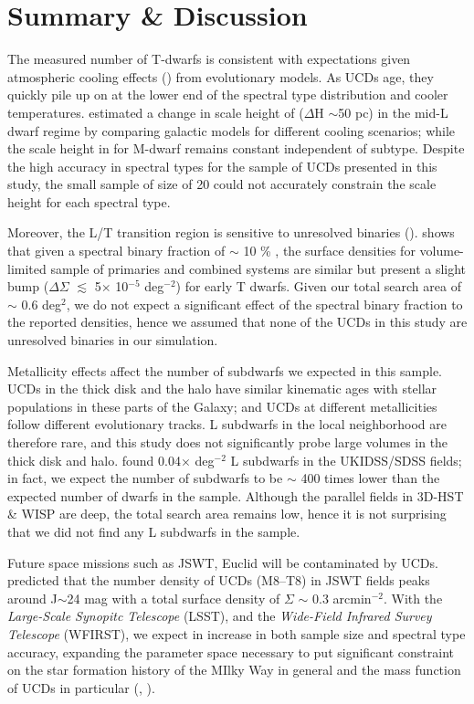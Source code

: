 \documentclass[manuscript]{aastex}
\begin{document}
\section{Summary \& Discussion}

The measured number of T-dwarfs is consistent with expectations given atmospheric cooling effects (\citealt{2004ApJS..155..191B}) from evolutionary models. As UCDs age, they quickly pile up on at the lower end of the spectral type distribution and cooler temperatures. \cite{Ryan2017} estimated a change in scale height of ($\Delta$H $\sim$50 pc) in the mid-L dwarf regime by comparing galactic models for different cooling scenarios; while the scale height in for M-dwarf remains constant independent of subtype. Despite the high accuracy in spectral types for the sample of UCDs presented in this study, the small sample of size of 20 could not accurately constrain the scale height for each spectral type.

Moreover, the L/T transition region is sensitive to unresolved binaries (\citealt{2014ApJ...794..143B}). \cite{2007ApJ...659..655B} shows that given a spectral binary fraction of $\sim$ 10 \% , the surface densities for volume-limited sample of primaries and combined systems are similar but present a slight bump ($\Delta \Sigma$ $\lesssim$ 5$\times$ 10$^{-5}$ deg$^{-2}$) for early T dwarfs. Given our total search area of $\sim$ 0.6 deg$^2$, we do not expect a significant effect of the spectral binary fraction to the reported densities, hence we assumed that none of the UCDs  in this study are unresolved binaries in our simulation.

Metallicity effects affect the number of subdwarfs we expected in this sample. UCDs in the thick disk and the halo have similar kinematic ages with stellar populations in these parts of the Galaxy; and UCDs at different metallicities follow different evolutionary tracks. L subdwarfs in the local neighborhood are therefore rare, and this study does not significantly probe large volumes in the thick disk and halo. \cite{Lodieu2017} found 0.04$\times$ deg$^{-2}$ L subdwarfs in the UKIDSS/SDSS fields; in fact, we expect the number of subdwarfs to be $\sim$ 400 times lower than the expected number of dwarfs in the sample. Although the parallel fields in 3D-HST \& WISP are deep, the total search area remains low, hence it is not surprising that we did not find any L subdwarfs in the sample. 

Future space missions such as JSWT, Euclid will be contaminated by UCDs. \cite{RyanJr.2016} predicted that the number density of UCDs (M8--T8) in JSWT fields peaks around J$\sim$24 mag with a total surface density of $\Sigma$ $\sim$ 0.3 arcmin$^{-2}$.  With the \textit{Large-Scale Synopitc Telescope} (LSST), and the \textit{Wide-Field Infrared Survey Telescope} (WFIRST), we expect in increase in both sample size and spectral type accuracy, expanding the parameter space necessary to put significant constraint on the star formation history of the MIlky Way in general and the mass function of UCDs in particular (\citealt{LSSTScienceCollaboration2009}, \citealt{Spergel2015}).
\end{document}
